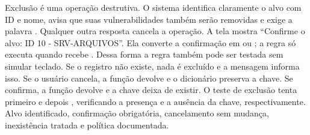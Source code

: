 
 Exclusão é uma operação destrutiva. O sistema identifica claramente o alvo com ID e nome, avisa que suas vulnerabilidades também serão removidas e exige a palavra . Qualquer outra resposta cancela a operação.
 A tela mostra ``Confirme o alvo: ID 10 - SRV-ARQUIVOS''. Ela converte a confirmação em  ou ; a regra  só executa  quando recebe . Dessa forma a regra também pode ser testada sem simular teclado.
 Se o registro não existe, nada é excluído e a mensagem informa isso. Se o usuário cancela, a função devolve  e o dicionário preserva a chave. Se confirma, a função devolve  e a chave deixa de existir.
 O teste de exclusão tenta primeiro  e depois , verificando a presença e a ausência da chave, respectivamente.
 Alvo identificado, confirmação obrigatória, cancelamento sem mudança, inexistência tratada e política documentada.

